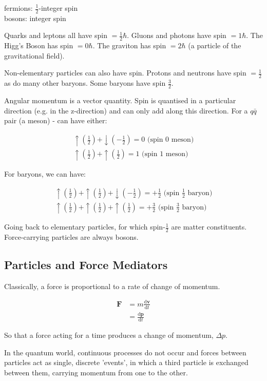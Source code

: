 \documentclass[10pt,a4paper]{article}
\newcommand{\suh}{\uparrow {\left(\frac{1}{2}\right)}}
\newcommand{\sdh}{\downarrow {\left(-\frac{1}{2}\right)}}
\begin{document}
\begin{center}
fermions: $\frac{1}{2}$-integer spin \\
bosons: integer spin
\end{center}

Quarks and leptons all have spin $= \frac{1}{2} \hbar$. Gluons and photons have spin $= 1 \hbar$. The Higg's Boson has spin $= 0 \hbar$. The graviton has spin $=2 \hbar$ (a particle of the gravitational field).

Non-elementary particles can also have spin. Protons and neutrons have spin $= \frac{1}{2}$ as do many other baryons. Some baryons have spin $\frac{3}{2}$.

Angular momentum is a vector quantity. Spin is quantised in a particular direction (e.g. in the z-direction) and can only add along this direction. For a $q\bar{q}$ pair (a meson) - can have either:

\begin{align*}
\suh + \sdh = 0 \text{ (spin 0 meson)} \\
\suh + \suh = 1 \text{ (spin 1 meson)}
\end{align*}

For baryons, we can have:

\begin{align*}
\suh + \suh + \sdh = + \frac{1}{2} \text{ (spin }\frac{1}{2}\text{ baryon)} \\
\suh + \suh + \suh = + \frac{3}{2} \text{ (spin }\frac{3}{2}\text{ baryon)}
\end{align*}

Going back to elementary particles, for which spin-$\frac{1}{2}$ are matter constituents. Force-carrying particles are always bosons.

\subsection*{Particles and Force Mediators}

Classically, a force is proportional to a rate of change of momentum.

\begin{align*}
\textbf{F} &= m \frac{\mathrm{d}\textbf{v}}{\mathrm{d}t} \\
&=  \frac{\mathrm{d}\textbf{p}}{\mathrm{d}t}
\end{align*}

So that a force acting for a time produces a change of momentum, $\Delta p$.

In the quantum world, continuous processes do not occur and forces between particles act as single, discrete 'events', in which a third particle is exchanged between them, carrying momentum from one to the other.
\end{document}
